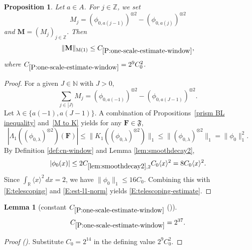 \documentclass[12pt,reqno]{amsart}
\newcommand{\auto}{{({\tiny\faCar})}}
\theoremstyle{plain}
\newtheorem{lemma}[theorem]{Lemma}
\newtheorem{proposition}[theorem]{Proposition}
\numberwithin{equation}{section}
\theoremstyle{remark}
\newcommand{\using}[1]{}
\newcommand{\Z}{{\mathbb Z}}
\newcommand{\R}{{\mathbb R}}
\begin{document}
\begin{proposition}\label{P:one-scale-estimate-window}\using{prism BL inequality}\using{M to K}\using{lem:smoothdecay2}
Let $a\in A$. For $j\in \Z$, we set
\begin{equation}\label{auto:one-scale-window-kernel}
M_j=(\phi_{0,a(j-1)})^{\otimes 2} - (\phi_{0,a(j)})^{\otimes 2}
\end{equation}
and $\mathbf{M}=(M_j)_{j\in \Z}$. Then
\begin{equation}\label{E:telescoping-estimate}
\|\mathbf{M}\|_{\rm M(1)} \leq C_{\ref{P:one-scale-estimate-window}},
\end{equation}
where $C_{\ref{P:one-scale-estimate-window}}=2^9C_0^2$.


\end{proposition}

\begin{proof}
For a given $J\in \mathbb N$ with $J>0$,
\begin{equation}\label{E:telescoping}
\sum_{j\in [J)} M_j=(\phi_{0,a(-1)})^{\otimes 2}-(\phi_{0,a(J-1)})^{\otimes 2}.
\end{equation}
Let $\lambda \in \{a(-1), a(J-1)\}$.
A combination of Propositions~\ref{prism BL inequality} and~\ref{M to K} yields for any $\mathbf{F} \in \mathfrak{F}$,
\begin{equation}\label{E:est-l1-norm}
|\Lambda_1 ((\phi_{0,\lambda})^{\otimes 2})(\mathbf{F})| \leq
\|K_1((\phi_{0,\lambda})^{\otimes 2})\|_1 \leq\|(\phi_{0,\lambda})^{\otimes 2}\|_1
=\|\phi_0\|_1^2.
\end{equation}
By Definition \ref{def:cn-window} and Lemma \ref{lem:smoothdecay2},
\begin{equation}\label{E:est-of-l1-norm}
|\phi_0(x)|
\le 2C_{\ref{lem:smoothdecay2},2}C_0\langle x\rangle^2
=8C_0\langle x\rangle^2.
\end{equation}
Since $\int_\R\langle x\rangle^2\,dx=2$, we have $\|\phi_0\|_1\le16C_0$. Combining this with \eqref{E:telescoping} and \eqref{E:est-l1-norm} yields \eqref{E:telescoping-estimate}.
\end{proof}

\begin{lemma}[constant $C_{\ref{P:one-scale-estimate-window}}$ \auto]\label{auto:constant-one-scale-window}
\begin{equation}\label{auto:constant-one-scale-window-bound}
C_{\ref{P:one-scale-estimate-window}}=2^{37}.
\end{equation}
\end{lemma}
\begin{proof}[Proof \auto]
Substitute $C_0=2^{14}$ in the defining value $2^9C_0^2$.
\end{proof}
\end{document}
